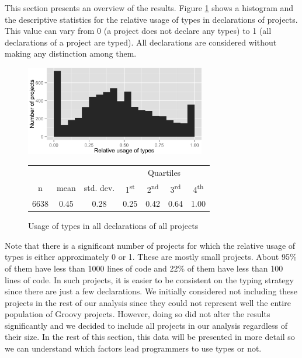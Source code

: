 \documentclass[msc]{ppgccufmg}
\newcommand{\ts}{\textsuperscript}
\begin{document}
This section presents an overview of the results.
Figure \ref{fig:all_histogram_all} shows a histogram and the descriptive statistics for the relative usage of types in declarations of projects.
This value can vary from 0 (a project does not declare any types) to 1 (all declarations of a project are typed). 
All declarations are considered without making any distinction among them.

\begin{figure}[h]
\centering 
\includegraphics[width=0.7\textwidth]{../aosd_2014/analysis/result/all/histograms/5_all_types.png} 

\vspace{0.3cm}

\begin{tabular}{|c|c|c|cccc|}
\hline
{}		&  {}		&  {}			&  \multicolumn{4}{c|}{Quartiles}				\\
n		& mean	& std. dev.	& 1\ts{st}	& 2\ts{nd}	& 3\ts{rd}	& 4\ts{th}		\\
\hline
\hline
6638 	& 0.45	& 0.28		& 0.25	& 0.42		& 0.64	& 1.00		\\
\hline
\end{tabular}


\caption{Usage of types in all declarations of all projects}
\label{fig:all_histogram_all} 
\end{figure}

Note that there is a significant number of projects for which the relative usage of types is either approximately 0 or 1.
These are mostly small projects.
About 95\% of them have less than 1000 lines of code and 22\% of them have less than 100 lines of code.
In such projects, it is easier to be consistent on the typing strategy since there are just a few declarations.
We initially considered not including these projects in the rest of our analysis since they could not represent well the entire population of Groovy projects.
However, doing so did not alter the results significantly and we decided to include all projects in our analysis regardless of their size.
In the rest of this section, this data will be presented in more detail so we can understand which factors lead programmers to use types or not.
\end{document}
